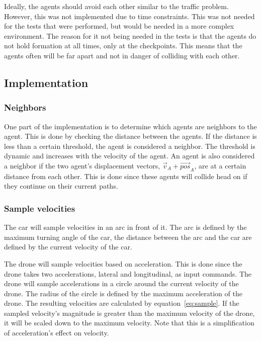 \documentclass[a4paper,12pt]{article}
\begin{document}
\begin{multicols}{2}
Ideally, the agents should avoid each other similar to the traffic problem. However, this was not implemented due to time constraints. This was not needed for the tests that were performed, but would be needed in a more complex environment. The reason for it not being needed in the tests is that the agents do not hold formation at all times, only at the checkpoints. This means that the agents often will be far apart and not in danger of colliding with each other.


\subsection{Implementation}
\label{sec:impl}


\subsubsection*{Neighbors}
One part of the implementation is to determine which agents are neighbors to the agent. This is done by checking the distance between the agents. If the distance is less than a certain threshold, the agent is considered a neighbor. The threshold is dynamic and increases with the velocity of the agent. An agent is also considered a neighbor if the two agent's displacement vectors, \( \vec{v}_A + \vec{pos}_A \), are at a certain distance from each other. This is done since these agents will collide head on if they continue on their current paths.


\subsubsection*{Sample velocities}
The car will sample velocities in an arc in front of it. The arc is defined by the maximum turning angle of the car, the distance between the arc and the car are defined by the current velocity of the car.

The drone will sample velocities based on acceleration. This is done since the drone takes two accelerations, lateral and longitudinal, as input commands. The drone will sample accelerations in a circle around the current velocity of the drone. The radius of the circle is defined by the maximum acceleration of the drone. The resulting velocities are calculated by equation~\ref{eq:sample}. If the sampled velocity's magnitude is greater than the maximum velocity of the drone, it will be scaled down to the maximum velocity. Note that this is a simplification of acceleration's effect on velocity.


\end{multicols}
\end{document}
